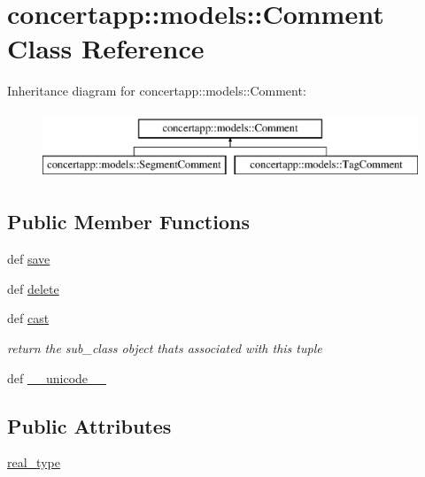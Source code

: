 \hypertarget{classconcertapp_1_1models_1_1_comment}{
\section{concertapp::models::Comment Class Reference}
\label{classconcertapp_1_1models_1_1_comment}
}
Inheritance diagram for concertapp::models::Comment:\begin{figure}[H]
\begin{center}
\leavevmode
\includegraphics[height=2.000000cm]{classconcertapp_1_1models_1_1_comment}
\end{center}
\end{figure}
\subsection*{Public Member Functions}
\begin{DoxyCompactItemize}
\item 
def \hyperlink{classconcertapp_1_1models_1_1_comment_a0d36cf4fd92d591de34c65933416687d}{save}
\item 
def \hyperlink{classconcertapp_1_1models_1_1_comment_a9964152ff66fe1a84a9d5c601e2a9548}{delete}
\item 
def \hyperlink{classconcertapp_1_1models_1_1_comment_a3312df19d56f80983c804d5f5c8e1ac3}{cast}
\begin{DoxyCompactList}\small\item\em return the sub\_\-class object thats associated with this tuple \item\end{DoxyCompactList}\item 
def \hyperlink{classconcertapp_1_1models_1_1_comment_a12c88663265637b447376d60c8baf10e}{\_\-\_\-unicode\_\-\_\-}
\end{DoxyCompactItemize}
\subsection*{Public Attributes}
\begin{DoxyCompactItemize}
\item 
\hyperlink{classconcertapp_1_1models_1_1_comment_aa11fc611392b8d8d932fcdee75feb0a2}{real\_\-type}
\end{DoxyCompactItemize}

